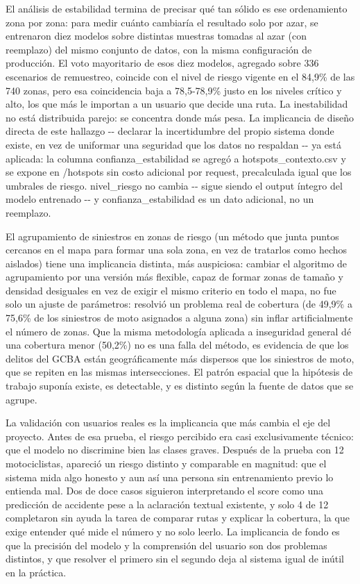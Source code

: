 El análisis de estabilidad termina de precisar qué tan sólido es ese
ordenamiento zona por zona: para medir cuánto cambiaría el resultado
solo por azar, se entrenaron diez modelos sobre distintas muestras
tomadas al azar (con reemplazo) del mismo conjunto de datos, con la
misma configuración de producción. El voto mayoritario de esos diez
modelos, agregado sobre 336 escenarios de remuestreo, coincide con el
nivel de riesgo vigente en el 84,9\% de las 740 zonas, pero esa
coincidencia baja a 78,5-78,9\% justo en los niveles crítico y alto, los
que más le importan a un usuario que decide una ruta. La inestabilidad
no está distribuida parejo: se concentra donde más pesa. La implicancia
de diseño directa de este hallazgo -\/- declarar la incertidumbre del
propio sistema donde existe, en vez de uniformar una seguridad que los
datos no respaldan -\/- ya está aplicada: la columna
confianza\_estabilidad se agregó a hotspots\_contexto.csv y se expone en
/hotspots sin costo adicional por request, precalculada igual que los
umbrales de riesgo. nivel\_riesgo no cambia -\/- sigue siendo el output
íntegro del modelo entrenado -\/- y confianza\_estabilidad es un dato
adicional, no un reemplazo.

El agrupamiento de siniestros en zonas de riesgo (un método que junta
puntos cercanos en el mapa para formar una sola zona, en vez de
tratarlos como hechos aislados) tiene una implicancia distinta, más
auspiciosa: cambiar el algoritmo de agrupamiento por una versión más
flexible, capaz de formar zonas de tamaño y densidad desiguales en vez
de exigir el mismo criterio en todo el mapa, no fue solo un ajuste de
parámetros: resolvió un problema real de cobertura (de 49,9\% a 75,6\%
de los siniestros de moto asignados a alguna zona) sin inflar
artificialmente el número de zonas. Que la misma metodología aplicada a
inseguridad general dé una cobertura menor (50,2\%) no es una falla del
método, es evidencia de que los delitos del GCBA están geográficamente
más dispersos que los siniestros de moto, que se repiten en las mismas
intersecciones. El patrón espacial que la hipótesis de trabajo suponía
existe, es detectable, y es distinto según la fuente de datos que se
agrupe.

La validación con usuarios reales es la implicancia que más cambia el
eje del proyecto. Antes de esa prueba, el riesgo percibido era casi
exclusivamente técnico: que el modelo no discrimine bien las clases
graves. Después de la prueba con 12 motociclistas, apareció un riesgo
distinto y comparable en magnitud: que el sistema mida algo honesto y
aun así una persona sin entrenamiento previo lo entienda mal. Dos de
doce casos siguieron interpretando el score como una predicción de
accidente pese a la aclaración textual existente, y solo 4 de 12
completaron sin ayuda la tarea de comparar rutas y explicar la
cobertura, la que exige entender qué mide el número y no solo leerlo. La
implicancia de fondo es que la precisión del modelo y la comprensión del
usuario son dos problemas distintos, y que resolver el primero sin el
segundo deja al sistema igual de inútil en la práctica.

